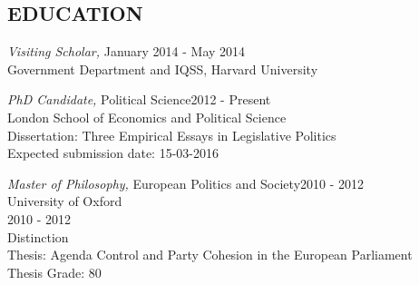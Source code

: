 \documentclass[line,margin]{res}
\begin{document}
\begin{resume}



\section{EDUCATION} 
		{\sl Visiting Scholar,} \hfill January 2014 - May 2014\\
                Government Department and IQSS, Harvard University\   

		{\sl PhD Candidate,} Political Science\hfill 2012 - Present\\
                London School of Economics and Political Science\\
                Dissertation: Three Empirical Essays in Legislative Politics\\
                Expected submission date: 15-03-2016        

					{\sl Master of Philosophy,} European Politics and Society\hfill 2010 - 2012 \\
                University of Oxford\\ 
                2010 - 2012 \\
                Distinction \\
                Thesis: Agenda Control and Party Cohesion in the European Parliament\\
				Thesis Grade: 80


\end{resume}
\end{document}
